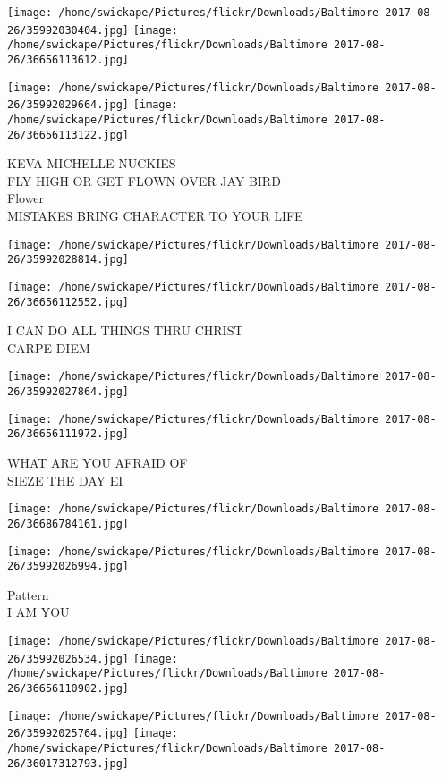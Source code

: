 \documentclass[10pt,letterpaper]{article}
\begin{document}
\texttt{[image: /home/swickape/Pictures/flickr/Downloads/Baltimore 2017-08-26/35992030404.jpg]}
\texttt{[image: /home/swickape/Pictures/flickr/Downloads/Baltimore 2017-08-26/36656113612.jpg]}

\texttt{[image: /home/swickape/Pictures/flickr/Downloads/Baltimore 2017-08-26/35992029664.jpg]}
\texttt{[image: /home/swickape/Pictures/flickr/Downloads/Baltimore 2017-08-26/36656113122.jpg]}

KEVA MICHELLE NUCKIES\\
FLY HIGH OR GET FLOWN OVER JAY BIRD\\
Flower\\
MISTAKES BRING CHARACTER TO YOUR LIFE
\pagebreak

\texttt{[image: /home/swickape/Pictures/flickr/Downloads/Baltimore 2017-08-26/35992028814.jpg]}

\vspace{0.25in}
\texttt{[image: /home/swickape/Pictures/flickr/Downloads/Baltimore 2017-08-26/36656112552.jpg]}

I CAN DO ALL THINGS THRU CHRIST\\
CARPE DIEM
\pagebreak

\texttt{[image: /home/swickape/Pictures/flickr/Downloads/Baltimore 2017-08-26/35992027864.jpg]}

\vspace{0.25in}
\texttt{[image: /home/swickape/Pictures/flickr/Downloads/Baltimore 2017-08-26/36656111972.jpg]}

WHAT ARE YOU AFRAID OF\\
SIEZE THE DAY EI
\pagebreak

\texttt{[image: /home/swickape/Pictures/flickr/Downloads/Baltimore 2017-08-26/36686784161.jpg]}

\vspace{0.25in}
\texttt{[image: /home/swickape/Pictures/flickr/Downloads/Baltimore 2017-08-26/35992026994.jpg]}

Pattern\\
I AM YOU
\pagebreak

\texttt{[image: /home/swickape/Pictures/flickr/Downloads/Baltimore 2017-08-26/35992026534.jpg]}
\texttt{[image: /home/swickape/Pictures/flickr/Downloads/Baltimore 2017-08-26/36656110902.jpg]}

\texttt{[image: /home/swickape/Pictures/flickr/Downloads/Baltimore 2017-08-26/35992025764.jpg]}
\texttt{[image: /home/swickape/Pictures/flickr/Downloads/Baltimore 2017-08-26/36017312793.jpg]}
\end{document}
